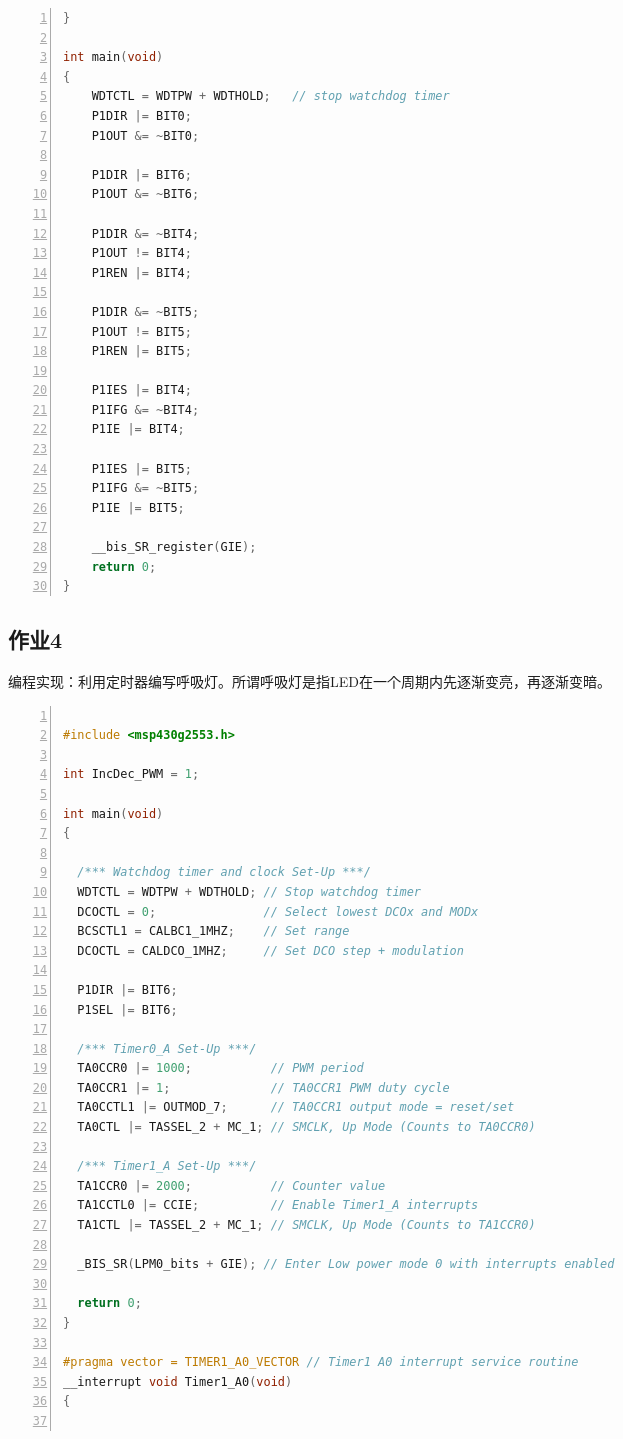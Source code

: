 \documentclass[a4paper,twoside,zihao=5,UTF8]{ctexart}
\begin{document}
\begin{spacing}{1.2}
\begin{lstlisting}[language=c++,numbers=left,style=CppStyle,caption=作业3,label={code:p3}]
}

int main(void)
{
    WDTCTL = WDTPW + WDTHOLD;   // stop watchdog timer
    P1DIR |= BIT0;
    P1OUT &= ~BIT0;

    P1DIR |= BIT6;
    P1OUT &= ~BIT6;

    P1DIR &= ~BIT4;
    P1OUT != BIT4;
    P1REN |= BIT4;

    P1DIR &= ~BIT5;
    P1OUT != BIT5;
    P1REN |= BIT5;

    P1IES |= BIT4;
    P1IFG &= ~BIT4;
    P1IE |= BIT4;

    P1IES |= BIT5;
    P1IFG &= ~BIT5;
    P1IE |= BIT5;

    __bis_SR_register(GIE);
    return 0;
}
\end{lstlisting}


\subsection{作业4}
编程实现：利用定时器编写呼吸灯。所谓呼吸灯是指LED在一个周期内先逐渐变亮，再逐渐变暗。

\begin{lstlisting}[language=c++,numbers=left,style=CppStyle,caption=作业4,label={code:p4}]

#include <msp430g2553.h>

int IncDec_PWM = 1;

int main(void)
{

  /*** Watchdog timer and clock Set-Up ***/
  WDTCTL = WDTPW + WDTHOLD; // Stop watchdog timer
  DCOCTL = 0;               // Select lowest DCOx and MODx
  BCSCTL1 = CALBC1_1MHZ;    // Set range
  DCOCTL = CALDCO_1MHZ;     // Set DCO step + modulation

  P1DIR |= BIT6;
  P1SEL |= BIT6;

  /*** Timer0_A Set-Up ***/
  TA0CCR0 |= 1000;           // PWM period
  TA0CCR1 |= 1;              // TA0CCR1 PWM duty cycle
  TA0CCTL1 |= OUTMOD_7;      // TA0CCR1 output mode = reset/set
  TA0CTL |= TASSEL_2 + MC_1; // SMCLK, Up Mode (Counts to TA0CCR0)

  /*** Timer1_A Set-Up ***/
  TA1CCR0 |= 2000;           // Counter value
  TA1CCTL0 |= CCIE;          // Enable Timer1_A interrupts
  TA1CTL |= TASSEL_2 + MC_1; // SMCLK, Up Mode (Counts to TA1CCR0)

  _BIS_SR(LPM0_bits + GIE); // Enter Low power mode 0 with interrupts enabled

  return 0;
}

#pragma vector = TIMER1_A0_VECTOR // Timer1 A0 interrupt service routine
__interrupt void Timer1_A0(void)
{


\end{lstlisting}
\end{spacing}
\end{document}
